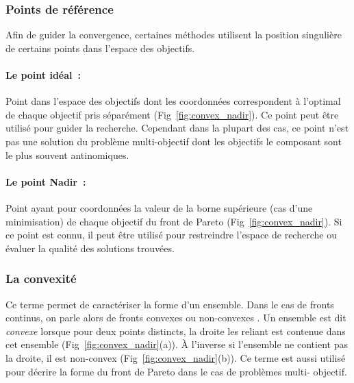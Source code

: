 \subsubsection{Points de référence} %
\label{ssub:points_de_reference}
Afin de guider la convergence, certaines méthodes utilisent la position singulière
de certains points dans l’espace des objectifs.
\paragraph{Le point idéal~:} %
\label{par:le_point_idéal}
Point dans l’espace des objectifs dont les coordonnées correspondent à l’optimal
de chaque objectif pris séparément (Fig~\ref{fig:convex_nadir}). Ce point peut
être utilisé pour guider la recherche. Cependant dans la plupart des cas, ce
point n’est pas une solution du problème multi-objectif dont les objectifs le
composant sont le plus souvent antinomiques.

\paragraph{Le point Nadir~:} %
\label{par:le_point_nadir}
Point ayant pour coordonnées la valeur de la borne supérieure (cas d’une
minimisation) de chaque objectif du front de Pareto (Fig~\ref{fig:convex_nadir}).
Si ce point est connu, il peut être utilisé pour restreindre l’espace de
recherche ou évaluer la qualité des solutions trouvées.


\subsubsection{La convexité} %
\label{ssub:la_convexite}
Ce terme permet de caractériser la forme d’un ensemble. Dans le cas de fronts continus,
on parle alors de fronts convexes ou non-convexes \parencite{Collette2002}. Un ensemble
est dit \emph{convexe} lorsque pour deux points distincts, la droite les reliant est
contenue dans cet ensemble (Fig~\ref{fig:convex_nadir}(a)). À l’inverse si l’ensemble ne
contient pas la droite, il est non-convex (Fig~\ref{fig:convex_nadir}(b)). Ce terme est
aussi utilisé pour décrire la forme du front de Pareto dans le cas de problèmes multi-
objectif.

